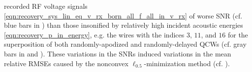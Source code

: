 recorded \ac{RF} voltage signals
\eqref{eqn:recovery_sys_lin_eq_v_rx_born_all_f_all_in_v_rx} of
worse \ac{SNR}
(cf. blue bars in ) than
those insonified by
relatively high incident acoustic energies
\eqref{eqn:recovery_p_in_energy}, e.g.
the wires with
the indices $3$, $11$, and $16$ for
the superposition of both
randomly-apodized and
randomly-delayed \acp{QCW}
(cf. gray bars in  and ).
These variations in
the \acp{SNR} induced
variations in
the mean relative \acp{RMSE} caused by
the nonconvex $\ell_{0.5}$-minimization method
(cf. ).
